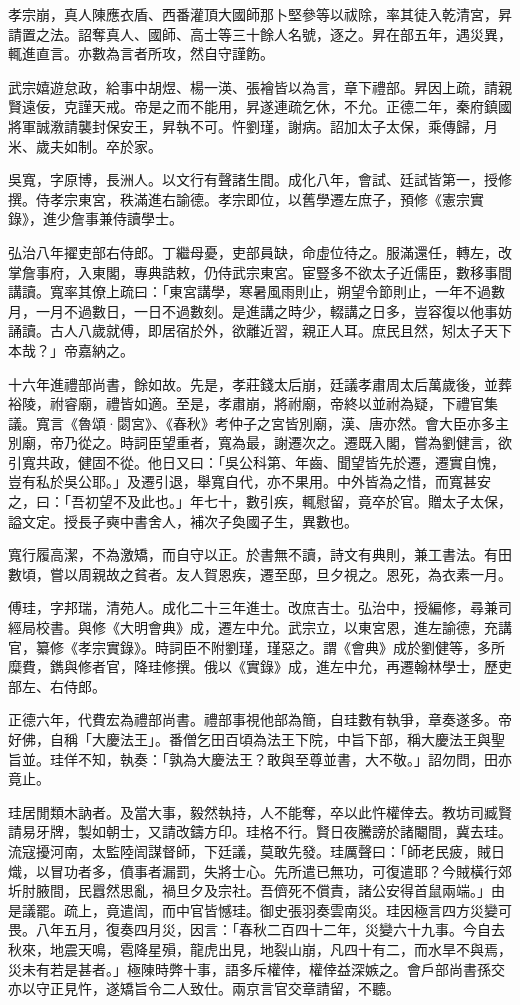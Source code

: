 \begin{pinyinscope}
孝宗崩，真人陳應衣盾、西番灌頂大國師那卜堅參等以祓除，率其徒入乾清宮，昇請置之法。詔奪真人、國師、高士等三十餘人名號，逐之。昇在部五年，遇災異，輒進直言。亦數為言者所攻，然自守謹飭。

武宗嬉遊怠政，給事中胡煜、楊一渶、張襘皆以為言，章下禮部。昇因上疏，請親賢遠佞，克謹天戒。帝是之而不能用，昇遂連疏乞休，不允。正德二年，秦府鎮國將軍誠漖請襲封保安王，昇執不可。忤劉瑾，謝病。詔加太子太保，乘傳歸，月米、歲夫如制。卒於家。

吳寬，字原博，長洲人。以文行有聲諸生間。成化八年，會試、廷試皆第一，授修撰。侍孝宗東宮，秩滿進右諭德。孝宗即位，以舊學遷左庶子，預修《憲宗實錄》，進少詹事兼侍讀學士。

弘治八年擢吏部右侍郎。丁繼母憂，吏部員缺，命虛位待之。服滿還任，轉左，改掌詹事府，入東閣，專典誥敕，仍侍武宗東宮。宦豎多不欲太子近儒臣，數移事間講讀。寬率其僚上疏曰：「東宮講學，寒暑風雨則止，朔望令節則止，一年不過數月，一月不過數日，一日不過數刻。是進講之時少，輟講之日多，豈容復以他事妨誦讀。古人八歲就傅，即居宿於外，欲離近習，親正人耳。庶民且然，矧太子天下本哉？」帝嘉納之。

十六年進禮部尚書，餘如故。先是，孝莊錢太后崩，廷議孝肅周太后萬歲後，並葬裕陵，祔睿廟，禮皆如適。至是，孝肅崩，將祔廟，帝終以並祔為疑，下禮官集議。寬言《魯頌·閟宮》、《春秋》考仲子之宮皆別廟，漢、唐亦然。會大臣亦多主別廟，帝乃從之。時詞臣望重者，寬為最，謝遷次之。遷既入閣，嘗為劉健言，欲引寬共政，健固不從。他日又曰：「吳公科第、年齒、聞望皆先於遷，遷實自愧，豈有私於吳公耶。」及遷引退，舉寬自代，亦不果用。中外皆為之惜，而寬甚安之，曰：「吾初望不及此也。」年七十，數引疾，輒慰留，竟卒於官。贈太子太保，謚文定。授長子奭中書舍人，補次子奐國子生，異數也。

寬行履高潔，不為激矯，而自守以正。於書無不讀，詩文有典則，兼工書法。有田數頃，嘗以周親故之貧者。友人賀恩疾，遷至邸，旦夕視之。恩死，為衣素一月。

傅珪，字邦瑞，清苑人。成化二十三年進士。改庶吉士。弘治中，授編修，尋兼司經局校書。與修《大明會典》成，遷左中允。武宗立，以東宮恩，進左諭德，充講官，纂修《孝宗實錄》。時詞臣不附劉瑾，瑾惡之。謂《會典》成於劉健等，多所糜費，鐫與修者官，降珪修撰。俄以《實錄》成，進左中允，再遷翰林學士，歷吏部左、右侍郎。

正德六年，代費宏為禮部尚書。禮部事視他部為簡，自珪數有執爭，章奏遂多。帝好佛，自稱「大慶法王」。番僧乞田百頃為法王下院，中旨下部，稱大慶法王與聖旨並。珪佯不知，執奏：「孰為大慶法王？敢與至尊並書，大不敬。」詔勿問，田亦竟止。

珪居閒類木訥者。及當大事，毅然執持，人不能奪，卒以此忤權倖去。教坊司臧賢請易牙牌，製如朝士，又請改鑄方印。珪格不行。賢日夜騰謗於諸閹間，冀去珪。流寇擾河南，太監陸訚謀督師，下廷議，莫敢先發。珪厲聲曰：「師老民疲，賊日熾，以冒功者多，僨事者漏罰，失將士心。先所遣已無功，可復遣耶？今賊橫行郊圻肘腋間，民囂然思亂，禍旦夕及宗社。吾儕死不償責，諸公安得首鼠兩端。」由是議罷。疏上，竟遣訚，而中官皆憾珪。御史張羽奏雲南災。珪因極言四方災變可畏。八年五月，復奏四月災，因言：「春秋二百四十二年，災變六十九事。今自去秋來，地震天鳴，雹降星殞，龍虎出見，地裂山崩，凡四十有二，而水旱不與焉，災未有若是甚者。」極陳時弊十事，語多斥權倖，權倖益深嫉之。會戶部尚書孫交亦以守正見忤，遂矯旨令二人致仕。兩京言官交章請留，不聽。


\end{pinyinscope}
